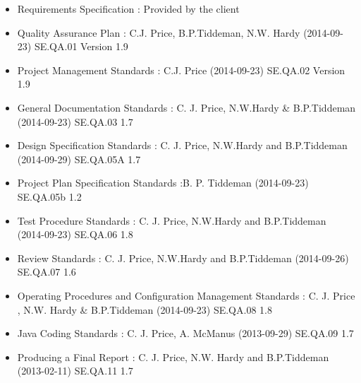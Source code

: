 \begin{itemize}
	\item Requirements Specification : Provided by the client
	\item Quality Assurance Plan : C.J. Price, B.P.Tiddeman, N.W. Hardy (2014-09-23) SE.QA.01 Version 1.9
	\item Project Management Standards : C.J. Price (2014-09-23) SE.QA.02 Version 1.9
	\item General Documentation Standards : C. J. Price, N.W.Hardy & B.P.Tiddeman (2014-09-23) SE.QA.03 1.7
	\item Design Specification Standards : C. J. Price, N.W.Hardy and B.P.Tiddeman (2014-09-29) SE.QA.05A 1.7
	\item Project Plan Specification Standards :B. P. Tiddeman (2014-09-23) SE.QA.05b 1.2
	\item Test Procedure Standards : C. J. Price, N.W.Hardy and B.P.Tiddeman (2014-09-23) SE.QA.06 1.8
	\item Review Standards : C. J. Price, N.W.Hardy and B.P.Tiddeman (2014-09-26) SE.QA.07 1.6
	\item Operating Procedures and Configuration Management Standards : C. J. Price , N.W. Hardy & B.P.Tiddeman (2014-09-23) SE.QA.08 1.8
	\item Java Coding Standards : C. J. Price, A. McManus (2013-09-29) SE.QA.09 1.7
	\item Producing a Final Report : C. J. Price, N.W. Hardy and B.P.Tiddeman (2013-02-11) SE.QA.11 1.7
\end{itemize}
